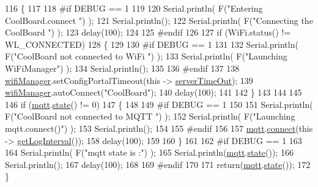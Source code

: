 \begin{DoxyCode}
116 \{
117 
118 \textcolor{preprocessor}{#if DEBUG == 1  }
119 
120     Serial.println( F(\textcolor{stringliteral}{"Entering CoolBoard.connect "}) );
121     Serial.println();
122     Serial.println( F(\textcolor{stringliteral}{"Connecting the CoolBoard  "}) );
123     delay(100);
124 
125 \textcolor{preprocessor}{#endif}
126 
127     \textcolor{keywordflow}{if} (WiFi.status() != WL\_CONNECTED)
128     \{       
129     
130 \textcolor{preprocessor}{    #if DEBUG == 1      }
131 
132         Serial.println( F(\textcolor{stringliteral}{"CoolBoard not connected to WiFi "}) );
133         Serial.println( F(\textcolor{stringliteral}{"Launching WiFiManager"}) );
134         Serial.println();
135 
136 \textcolor{preprocessor}{    #endif}
137     
138         \hyperlink{classCoolBoard_a55b28656e295140928557c47d7fff01e}{wifiManager}.setConfigPortalTimeout(\textcolor{keyword}{this} -> \hyperlink{classCoolBoard_a7a8d8d3d316220cdd049cd63c1aa8fe6}{serverTimeOut});
139         \hyperlink{classCoolBoard_a55b28656e295140928557c47d7fff01e}{wifiManager}.autoConnect(\textcolor{stringliteral}{"CoolBoard"});
140         delay(100);
141 
142     \}
143 
144 
145     
146     \textcolor{keywordflow}{if} (\hyperlink{classCoolBoard_a2399f44d7c23c1149a335cb3b46d90f1}{mqtt}.\hyperlink{classCoolMQTT_a5d003307eff78efbd585e42b43b72b6d}{state}() != 0)
147     \{   
148     
149 \textcolor{preprocessor}{    #if DEBUG == 1  }
150     
151         Serial.println( F(\textcolor{stringliteral}{"CoolBoard not connected to MQTT "}) );
152         Serial.println( F(\textcolor{stringliteral}{"Launching mqtt.connect()"}) );
153         Serial.println();
154 
155 \textcolor{preprocessor}{    #endif  }
156     
157         \hyperlink{classCoolBoard_a2399f44d7c23c1149a335cb3b46d90f1}{mqtt}.\hyperlink{classCoolMQTT_a58b0b1f64b269c2681685208262fba1d}{connect}(\textcolor{keyword}{this} -> \hyperlink{classCoolBoard_aaa24480b273fc095a1356a589c333781}{getLogInterval}());
158         delay(100);
159         
160     \}
161     
162 \textcolor{preprocessor}{#if DEBUG == 1}
163 
164     Serial.println( F(\textcolor{stringliteral}{"mqtt state is :"}) );
165     Serial.println(\hyperlink{classCoolBoard_a2399f44d7c23c1149a335cb3b46d90f1}{mqtt}.\hyperlink{classCoolMQTT_a5d003307eff78efbd585e42b43b72b6d}{state}());
166     Serial.println();
167     delay(100);
168 
169 \textcolor{preprocessor}{#endif}
170 
171     \textcolor{keywordflow}{return}(\hyperlink{classCoolBoard_a2399f44d7c23c1149a335cb3b46d90f1}{mqtt}.\hyperlink{classCoolMQTT_a5d003307eff78efbd585e42b43b72b6d}{state}());
172 \}
\end{DoxyCode}
